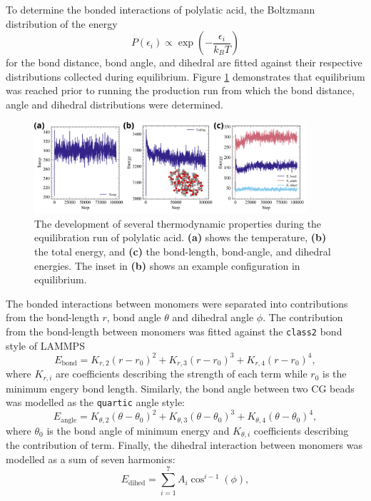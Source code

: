 \documentclass[10pt,a4paper]{labreport}
\begin{document}
  To determine the bonded interactions of polylatic acid, the Boltzmann distribution of the energy
  \begin{equation}
    P(\epsilon_i) \propto \exp\left(-\frac{\epsilon_i}{k_B T}\right)
    \label{eq:Boltzmann}
  \end{equation} 
  for the bond distance, bond angle, and dihedral are fitted against their respective distributions collected during equilibrium. 
  Figure \ref{fig:ass1_equilib} demonstrates that equilibrium was reached prior to running the production run from which the bond distance, angle and dihedral distributions were determined.  
  \begin{figure}[h]
    \centering 
    \includegraphics[width = 0.9\textwidth]{figs/ass1_equilib.png}
    \caption{The development of several thermodynamic properties during the equilibration run of polylatic acid. \textbf{(a)} shows the temperature, \textbf{(b)} the total energy, and \textbf{(c)} the bond-length, bond-angle, and dihedral energies. The inset in \textbf{(b)} shows an example configuration in equilibrium. }
    \label{fig:ass1_equilib}
  \end{figure}

  The bonded interactions between monomers were separated into contributions from the bond-length $r$, bond angle $\theta$ and dihedral angle $\phi$.
  The contribution from the bond-length between monomers was fitted against the \texttt{class2} bond style of LAMMPS
  \begin{equation}
    E_\text{bond} = K_{r,2}(r - r_0)^2 +   K_{r,3}(r - r_0)^3 +  K_{r,4}(r - r_0)^4,
    \label{eq:ass1_bondEngery}
  \end{equation}
  where $K_{r,i}$ are coefficients describing the strength of each term while $r_0$ is the minimum engery bond length. 
  Similarly, the bond angle between two CG beads was modelled as the \texttt{quartic} angle style:
    \begin{equation}
    E_\text{angle} = K_{\theta,2}(\theta - \theta_0)^2 +   K_{\theta,3}(\theta - \theta_0)^3 +  K_{\theta,4}(\theta - \theta_0)^4,
    \label{eq:ass1_angleEngery}
  \end{equation}
  where $\theta_0$ is the bond angle of minimum energy and $K_{\theta,i}$ coefficients describing the contribution of term. 
  Finally, the dihedral interaction between monomers was modelled as a sum of seven harmonics:
  \begin{equation}
    E_\text{dihed} = \sum_{i=1}^7 A_i \cos^{i-1}(\phi),
    \label{eq:ass1_dihedEnergy}
  \end{equation}
\end{document}
